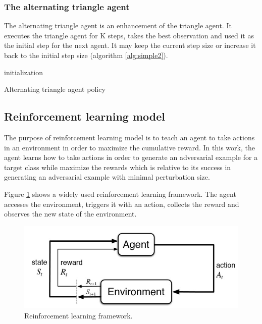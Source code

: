 \documentclass{article}
\begin{document}
\subsubsection{The alternating triangle agent}
The alternating triangle agent is an enhancement of the triangle agent. It executes the triangle agent for K steps, takes the best observation and used it as the initial step for the next agent. It may keep the current step size or increase it back to the initial step size (algorithm \ref{alg:simple2}).

\begin{algorithm}[H] \label{alg:simple2}
\SetAlgoLined
{}
 initialization\;
 \caption{Alternating triangle agent policy}
\end{algorithm}

\subsection{Reinforcement learning model}
The purpose of reinforcement learning model is to teach an agent to take actions in an environment in order to maximize the cumulative reward. In this work, the agent learns how to take actions in order to generate an adversarial example for a target class while maximize the rewards which is relative to its success in generating an adversarial example with minimal perturbation size.

Figure \ref{fig:rl_model} shows a widely used reinforcement learning framework. The agent accesses the environment, triggers it with an action, collects the reward and observes the new state of the environment.

\begin{figure}[H]
    \centering
        \includegraphics[scale=.8]{reinforcement-learning-fig1-700.jpg}
    \caption{Reinforcement learning framework.}
    \label{fig:rl_model}
\end{figure}
\end{document}
